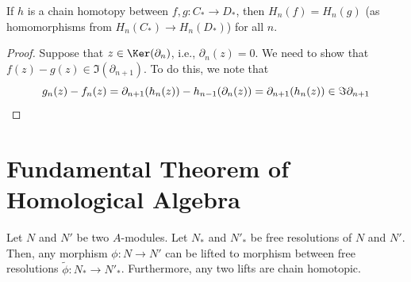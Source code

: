 \begin{proposition}
    \label{prop:chain_homotopy}
    If $h$ is a chain homotopy between
    $f,g : C_*\to D_*$, then $H_n(f) = H_n(g)$
    (as homomorphisms from $H_n(C_*)\to H_n(D_*)$) for all $n$.
\end{proposition}
\begin{proof}
    Suppose that $z\in \Ker(\partial_n)$,
    i.e., $\partial_n(z)=0$.
    We need to show that $f(z)-g(z) \in \Im(\partial_{n+1})$.
    To do this, we note that
    \[g_n(z)-f_n(z) = \partial_{n+1}(h_n(z)) - h_{n-1}(\partial_n(z))
    =\partial_{n+1}(h_n(z)) \in \Im\partial_{n+1}
    \qedhere\]
\end{proof}

\section{Fundamental Theorem of Homological Algebra}
\begin{theorem}
\label{thm:homological_alg}
Let $N$ and $N'$ be two $A$-modules.
Let $N_*$ and $N'_*$ be free resolutions of $N$ and $N'$.
Then, any morphism $\phi : N\to N'$ can be lifted to
morphism between free resolutions $\widetilde\phi : N_*\to N'_*$.
Furthermore, any two lifts are chain homotopic.
\end{theorem}

